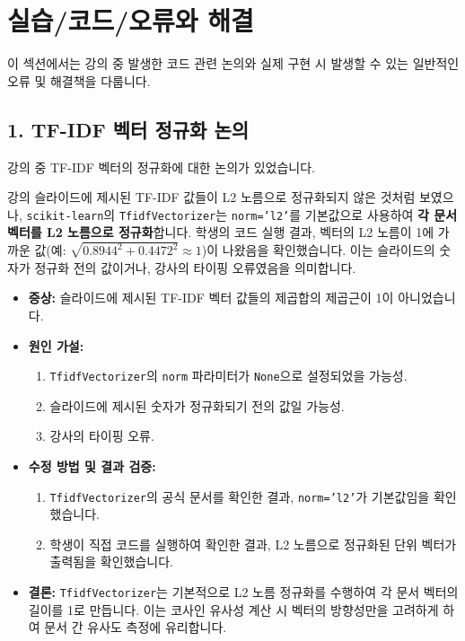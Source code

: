 \documentclass[11pt,a4paper]{article}
\theoremstyle{definition}
\newcommand{\newsection}[1]{\newpage\section{#1}}
\begin{document}
\newsection{실습/코드/오류와 해결}

이 섹션에서는 강의 중 발생한 코드 관련 논의와 실제 구현 시 발생할 수 있는 일반적인 오류 및 해결책을 다룹니다.

\subsection{1. TF-IDF 벡터 정규화 논의}
강의 중 TF-IDF 벡터의 정규화에 대한 논의가 있었습니다.

\begin{tcolorbox}[warningbox, title=⚠️ TF-IDF 벡터 정규화 불일치 논의]
강의 슬라이드에 제시된 TF-IDF 값들이 L2 노름으로 정규화되지 않은 것처럼 보였으나, \texttt{scikit-learn}의 \texttt{TfidfVectorizer}는 \texttt{norm='l2'}를 기본값으로 사용하여 \textbf{각 문서 벡터를 L2 노름으로 정규화}합니다.
학생의 코드 실행 결과, 벡터의 L2 노름이 1에 가까운 값(예: $\sqrt{0.8944^2 + 0.4472^2} \approx 1$)이 나왔음을 확인했습니다.
이는 슬라이드의 숫자가 정규화 전의 값이거나, 강사의 타이핑 오류였음을 의미합니다.
\end{tcolorbox}

\begin{itemize}
    \item \textbf{증상:} 슬라이드에 제시된 TF-IDF 벡터 값들의 제곱합의 제곱근이 1이 아니었습니다.
    \item \textbf{원인 가설:}
        \begin{enumerate}
            \item \texttt{TfidfVectorizer}의 \texttt{norm} 파라미터가 \texttt{None}으로 설정되었을 가능성.
            \item 슬라이드에 제시된 숫자가 정규화되기 전의 값일 가능성.
            \item 강사의 타이핑 오류.
        \end{enumerate}
    \item \textbf{수정 방법 및 결과 검증:}
        \begin{enumerate}
            \item \texttt{TfidfVectorizer}의 공식 문서를 확인한 결과, \texttt{norm='l2'}가 기본값임을 확인했습니다.
            \item 학생이 직접 코드를 실행하여 확인한 결과, L2 노름으로 정규화된 단위 벡터가 출력됨을 확인했습니다.
        \end{enumerate}
    \item \textbf{결론:} \texttt{TfidfVectorizer}는 기본적으로 L2 노름 정규화를 수행하여 각 문서 벡터의 길이를 1로 만듭니다. 이는 코사인 유사성 계산 시 벡터의 방향성만을 고려하게 하여 문서 간 유사도 측정에 유리합니다.
\end{itemize}
\end{document}
